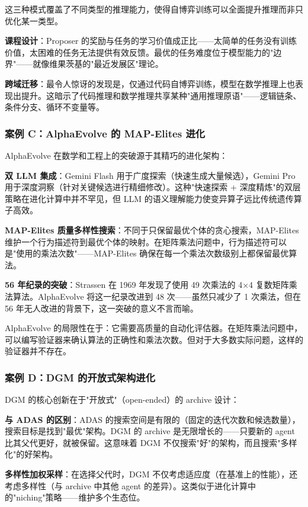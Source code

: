 这三种模式覆盖了不同类型的推理能力，使得自博弈训练可以全面提升推理而非只优化某一类型。

\textbf{课程设计}：Proposer 的奖励与任务的学习价值成正比——太简单的任务没有训练价值，太困难的任务无法提供有效反馈。最优的任务难度位于模型能力的"边界"——就像维果茨基的"最近发展区"理论。

\textbf{跨域迁移}：最令人惊讶的发现是，仅通过代码自博弈训练，模型在数学推理上也表现出提升。这暗示了代码推理和数学推理共享某种"通用推理原语"——逻辑链条、条件分支、循环不变量等。

\subsubsection{案例 C：AlphaEvolve 的 MAP-Elites 进化}

AlphaEvolve 在数学和工程上的突破源于其精巧的进化架构：

\textbf{双 LLM 集成}：Gemini Flash 用于广度探索（快速生成大量候选），Gemini Pro 用于深度洞察（针对关键候选进行精细修改）。这种"快速探索 + 深度精炼"的双层策略在进化计算中并不罕见，但 LLM 的语义理解能力使变异算子远比传统遗传算子高效。

\textbf{MAP-Elites 质量多样性搜索}：不同于只保留最优个体的贪心搜索，MAP-Elites 维护一个行为描述符到最优个体的映射。在矩阵乘法问题中，行为描述符可以是"使用的乘法次数"——MAP-Elites 确保在每一个乘法次数级别上都保留最优算法。

\textbf{56 年纪录的突破}：Strassen 在 1969 年发现了使用 49 次乘法的 4×4 复数矩阵乘法算法。AlphaEvolve 将这一纪录改进到 48 次——虽然只减少了 1 次乘法，但在 56 年无人改进的背景下，这一突破的意义不言而喻。

AlphaEvolve 的局限性在于：它需要高质量的自动化评估器。在矩阵乘法问题中，可以编写验证器来确认算法的正确性和乘法次数。但对于大多数实际问题，这样的验证器并不存在。

\subsubsection{案例 D：DGM 的开放式架构进化}

DGM 的核心创新在于"开放式"（open-ended）的 archive 设计：

\textbf{与 ADAS 的区别}：ADAS 的搜索空间是有限的（固定的迭代次数和候选数量），搜索目标是找到"最优"架构。DGM 的 archive 是无限增长的——只要新的 agent 比其父代更好，就被保留。这意味着 DGM 不仅搜索"好"的架构，而且搜索"多样化"的好架构。

\textbf{多样性加权采样}：在选择父代时，DGM 不仅考虑适应度（在基准上的性能），还考虑多样性（与 archive 中其他 agent 的差异）。这类似于进化计算中的"niching"策略——维护多个生态位。

